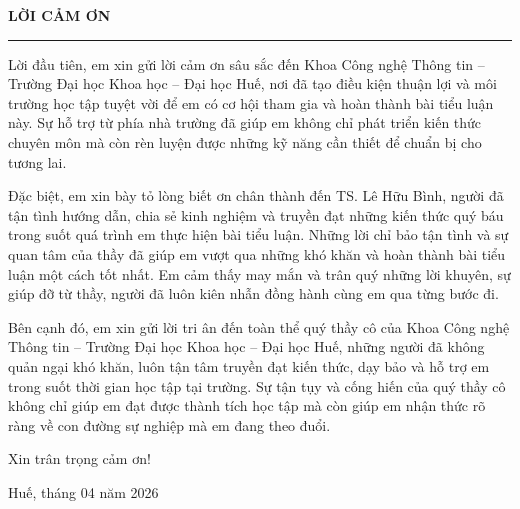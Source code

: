 \documentclass[12pt, a4paper]{article}
\begin{document}
\thispagestyle{empty}
\vspace*{0.4cm}
\begin{center}
  \fontsize{17}{21}\selectfont\bfseries LỜI CẢM ƠN\par
  \vspace{0.2ex}
  \rule{0.28\textwidth}{1.8pt}
\end{center}
\vspace{0.6cm}

\parindent=1.1cm
\setlength{\parskip}{0.55ex plus 0.2ex}

Lời đầu tiên, em xin gửi lời cảm ơn sâu sắc đến Khoa Công nghệ Thông tin – Trường Đại học Khoa học – Đại học Huế, nơi đã tạo điều kiện thuận lợi và môi trường học tập tuyệt vời để em có cơ hội tham gia và hoàn thành bài tiểu luận này. Sự hỗ trợ từ phía nhà trường đã giúp em không chỉ phát triển kiến thức chuyên môn mà còn rèn luyện được những kỹ năng cần thiết để chuẩn bị cho tương lai.

Đặc biệt, em xin bày tỏ lòng biết ơn chân thành đến TS. Lê Hữu Bình, người đã tận tình hướng dẫn, chia sẻ kinh nghiệm và truyền đạt những kiến thức quý báu trong suốt quá trình em thực hiện bài tiểu luận. Những lời chỉ bảo tận tình và sự quan tâm của thầy đã giúp em vượt qua những khó khăn và hoàn thành bài tiểu luận một cách tốt nhất. Em cảm thấy may mắn và trân quý những lời khuyên, sự giúp đỡ từ thầy, người đã luôn kiên nhẫn đồng hành cùng em qua từng bước đi.

Bên cạnh đó, em xin gửi lời tri ân đến toàn thể quý thầy cô của Khoa Công nghệ Thông tin – Trường Đại học Khoa học – Đại học Huế, những người đã không quản ngại khó khăn, luôn tận tâm truyền đạt kiến thức, dạy bảo và hỗ trợ em trong suốt thời gian học tập tại trường. Sự tận tụy và cống hiến của quý thầy cô không chỉ giúp em đạt được thành tích học tập mà còn giúp em nhận thức rõ ràng về con đường sự nghiệp mà em đang theo đuổi.

Xin trân trọng cảm ơn!

\parindent=0pt
\parskip=0pt
\vspace{0.5cm}
\hfill\begin{minipage}[t]{7cm}
  \fontsize{13}{17}\selectfont
  \begin{flushright}
    Huế, tháng 04 năm 2026
  \end{flushright}
\end{minipage}
\end{document}
